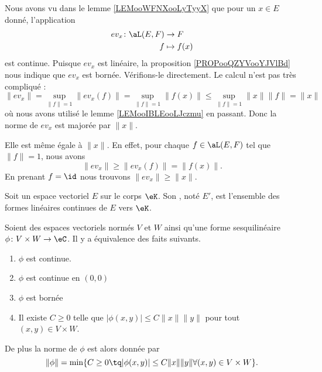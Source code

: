 \begin{example}     \label{EXooTQPEooRRdddt}
    Nous avons vu dans le lemme \ref{LEMooWFNXooLyTyyX} que pour un \( x\in E\) donné, l'application
    \begin{equation}
        \begin{aligned}
            ev_x\colon \aL(E,F) & \to F \\
                         f      & \mapsto f(x)
        \end{aligned}
    \end{equation}
    est continue. Puisque \( ev_x\) est linéaire, la proposition \ref{PROPooQZYVooYJVlBd} nous indique que \( ev_x\) est bornée. Vérifions-le directement. Le calcul n'est pas très compliqué :
    \begin{equation}
        \| ev_x \|=\sup_{\| f \|=1}\| ev_x(f) \|=\sup_{\| f \|=1}\| f(x) \|\leq \sup_{\| f \|=1}\| x \|\| f \|=\| x \|
    \end{equation}
    où nous avons utilisé le lemme \ref{LEMooIBLEooLJczmu} en passant. Donc la norme de \( ev_x\) est majorée par \( \| x \|\).

    Elle est même égale à \( \| x \|\). En effet, pour chaque \( f\in \aL(E,F)\) tel que \(  \| f \|=1\), nous avons
    \begin{equation}
        \| ev_x \|\geq \| ev_x(f) \|=\| f(x) \|.
    \end{equation}
    En prenant \( f=\id\) nous trouvons \(  \| ev_x \|\geq \| x \|  \).
\end{example}

\begin{definition}      \label{DEFooKSDFooGIBtrG}
    Soit un espace vectoriel \( E\) sur le corps \( \eK\). Son , noté \( E'\), est l'ensemble des formes linéaires continues de \( E\) vers \( \eK\).
\end{definition}

\begin{proposition}      \label{PROPooQFTSooPFfbCc}
    Soient des espaces vectoriels normés \( V\) et \( W\) ainsi qu'une forme sesquilinéaire \( \phi\colon V\times W\to \eC\). Il y a équivalence des faits suivants.
    \begin{enumerate}
        \item
            \( \phi\) est continue.
        \item
            \( \phi\) est continue en \( (0,0)\)
        \item
            \( \phi\) est bornée
        \item
            Il existe \( C\geq 0\) telle que \( | \phi(x,y) |\leq C\| x \|\| y \|  \) pour tout \( (x,y)\in V\times W\).
    \end{enumerate}
    De plus la norme de \( \phi\) est alors donnée par
    \begin{equation}
        \| \phi \|=\min\{  C\geq 0\tq | \phi(x,y) |\leq C\| x \|\| y \|\forall (x,y)\in V\times W  \}.
    \end{equation}
\end{proposition}

